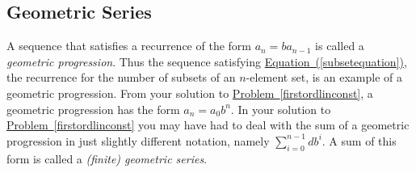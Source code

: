 \documentclass[10pt,]{book}
\theoremstyle{plain}
\theoremstyle{definition}
\numberwithin{equation}{chapter}
\begin{document}
\typeout{************************************************}
\typeout{************************************************}
\subsection[{Geometric Series}]{Geometric Series}\label{subsection-14}
A sequence that satisfies a recurrence of the form \(a_n=ba_{n-1}\) is called a \emph{geometric progression}. Thus the sequence satisfying \hyperref[subsetequation]{Equation~(\ref{subsetequation})}, the recurrence for the number of subsets of an \(n\)-element set, is an example of a geometric progression. From your solution to \hyperref[firstordlinconst]{Problem~\ref{firstordlinconst}}, a geometric progression has the form \(a_n=a_0b^n\). In your solution to \hyperref[firstordlinconst]{Problem~\ref{firstordlinconst}} you may have had to deal with the sum of a geometric progression in just slightly different notation, namely \(\sum_{i=0}^{n-1}db^i\). A sum of this form is called a \emph{(finite) geometric series}.%
\end{document}
